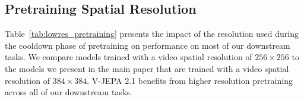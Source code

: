 \documentclass[]{fairmeta}
\begin{document}
\subsection{Pretraining Spatial Resolution}

Table~\ref{tab:lowres_pretraining} presents the impact of the resolution used during the cooldown phase of pretraining on performance on most of our downstream tasks. We compare models trained with a video spatial resolution of $256 \times 256$ to the models we present in the main paper that are trained with a video spatial resolution of $384 \times 384$. V-JEPA 2.1 benefits from higher resolution pretraining across all of our downstream tasks.

\begin{table}
\caption{\textbf{Impact of pretraining spatial resolution.} We compare models trained during the cooldown phase at $256 \times 256$ spatial resolution against $384 \times 384$.}
\label{tab:lowres_pretraining}
\end{table}
\end{document}
